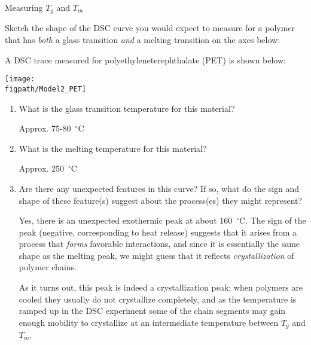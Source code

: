 \begin{activity}{Measuring $T_g$ and $T_m$}
\begin{ctqs}
	\question Sketch the shape of the DSC curve you would expect to measure for a polymer that has \emph{both} a glass transition \emph{and} a melting transition on the axes below:
	
		\vspace{6pt}
		\begin{solution}[2.5in]\end{solution}
	
	\clearpage
	\question A DSC trace measured for polyethyleneterephthalate (PET) is shown below:
	
		\vspace{6pt}
		\centerline{\texttt{[image: \\figpath/Model2\_PET]}}
	
		\begin{enumerate}
			\item What is the glass transition temperature for this material?
			
				\begin{solution}[0.5in]
					Approx. 75-80~$^\circ$C
				\end{solution}
			
			\item What is the melting temperature for this material?
			
				\begin{solution}[0.5in]
					Approx. 250~$^\circ$C
				\end{solution}
			
			\item Are there any unexpected features in this curve? If so, what do the sign and shape of these feature(s) suggest about the process(es) they might represent?
			
				\begin{solution}[2in]
					Yes, there is an unexpected exothermic peak at about 160~$^\circ$C.  The sign of the peak (negative, corresponding to heat release) suggests that it arises from a process that \emph{forms} favorable interactions, and since it is essentially the same shape as the melting peak, we might guess that it reflects \emph{crystallization} of polymer chains.
					
					As it turns out, this peak is indeed a crystallization peak; when polymers are cooled they usually do not crystallize completely, and as the temperature is ramped up in the DSC experiment some of the chain segments may gain enough mobility to crystallize at an intermediate temperature between $T_g$ and $T_m$.
				\end{solution}
		\end{enumerate}
	

\end{ctqs}
\end{activity}
